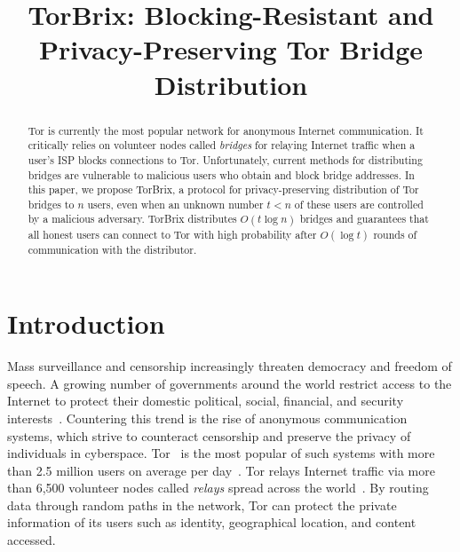\documentclass[letterpaper,twocolumn,10pt]{article}
\title{TorBrix: Blocking-Resistant and Privacy-Preserving Tor Bridge Distribution}
\newcommand{\sfsize}{\fontsize{0.73\baselineskip}{0.73\baselineskip}\selectfont}
\newcommand{\sans}[1]{\textsf{\sfsize \mbox{#1}}}
\newcommand{\brix}{\sans{TorBrix}\xspace}
\begin{document}
\maketitle

\begin{abstract}

	Tor is currently the most popular network for anonymous Internet communication. It critically relies on volunteer nodes called \emph{bridges} for relaying Internet traffic when a user's ISP blocks connections to Tor. 
	Unfortunately, current methods for distributing bridges are vulnerable to malicious users who obtain and block bridge addresses.
	In this paper, we propose \brix, a protocol for privacy-preserving distribution of Tor bridges to $n$ users, even when an unknown number ${t < n}$ of these users are controlled by a malicious adversary. \brix distributes $O(t\log{n})$ bridges and guarantees that all honest users can connect to Tor with high probability after $O(\log{t})$ rounds of communication with the distributor. %
\end{abstract}

\section{Introduction}
Mass surveillance and censorship increasingly threaten democracy and freedom of speech. A growing number of governments around the world restrict access to the Internet to protect their domestic political, social, financial, and security interests~\cite{Turner:2016:Surveillance,Rushe:2012:Censorship}. Countering this trend is the rise of anonymous communication systems, which strive to counteract censorship and preserve the privacy of individuals in cyberspace. Tor~\cite{dingledine:2004} is the most popular of such systems with more than 2.5 million users on average per day~\cite{Tor:Users}. Tor relays Internet traffic via more than 6,500 volunteer nodes called \emph{relays} spread across the world~\cite{Tor:Relays}. By routing data through random paths in the network, Tor can protect the private information of its users such as identity, geographical location, and content accessed.
\end{document}
